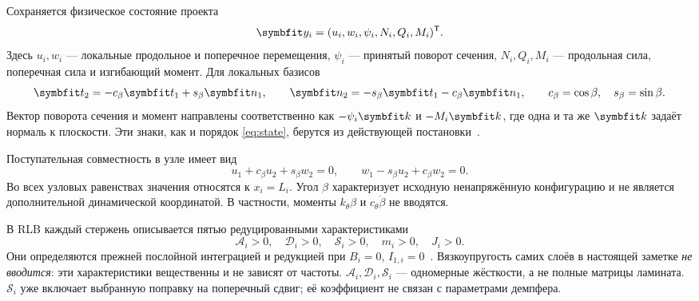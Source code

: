 \documentclass[11pt,a4paper]{article}
\numberwithin{equation}{section}
\newcommand{\A}{\mathcal A}
\newcommand{\D}{\mathcal D}
\newcommand{\Sbeam}{\mathcal S}
\newcommand{\kth}{k_\theta}
\newcommand{\cth}{c_\theta}
\begin{document}
Сохраняется физическое состояние проекта
\begin{equation}
 \symbfit y_i=(u_i,w_i,\psi_i,N_i,Q_i,M_i)^{\mathsf T}.
 \label{eq:state}
\end{equation}
Здесь $u_i,w_i$ --- локальные продольное и поперечное перемещения,
$\psi_i$ --- принятый поворот сечения, $N_i,Q_i,M_i$ --- продольная сила,
поперечная сила и изгибающий момент. Для локальных базисов
\begin{equation}
 \symbfit t_2=-c_\beta\symbfit t_1+s_\beta\symbfit n_1,
 \qquad
 \symbfit n_2=-s_\beta\symbfit t_1-c_\beta\symbfit n_1,
 \qquad c_\beta=\cos\beta,\quad s_\beta=\sin\beta.
 \label{eq:basis}
\end{equation}
Вектор поворота сечения и момент направлены соответственно как
$-\psi_i\symbfit k$ и $-M_i\symbfit k$, где одна и та же
$\symbfit k$ задаёт нормаль к плоскости. Эти знаки, как и порядок
\eqref{eq:state}, берутся из действующей постановки~\cite{projectjoint}.

Поступательная совместность в узле имеет вид
\begin{equation}
 u_1+c_\beta u_2+s_\beta w_2=0,
 \qquad
 w_1-s_\beta u_2+c_\beta w_2=0.
 \label{eq:translation}
\end{equation}
Во всех узловых равенствах значения относятся к $x_i=L_i$.
Угол $\beta$ характеризует исходную ненапряжённую конфигурацию и не является
дополнительной динамической координатой. В частности, моменты
$\kth\beta$ и $\cth\dot\beta$ не вводятся.

В RLB каждый стержень описывается пятью редуцированными характеристиками
\[
 \A_i>0,\quad \D_i>0,\quad \Sbeam_i>0,\quad m_i>0,\quad J_i>0.
\]
Они определяются прежней послойной интеграцией и редукцией при $B_i=0$,
$I_{1,i}=0$~\cite{projectsource}. Вязкоупругость самих слоёв в настоящей
заметке \emph{не вводится}: эти характеристики вещественны и не зависят
от частоты. $\A_i,\D_i,\Sbeam_i$ --- одномерные жёсткости, а не полные
матрицы ламината. $\Sbeam_i$ уже включает выбранную поправку на поперечный
сдвиг; её коэффициент не связан с параметрами демпфера.
\end{document}
